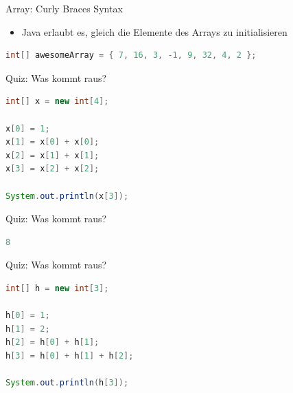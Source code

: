 \documentclass[18pt]{beamer}
\begin{document}
\begin{frame}[fragile]{Array: Curly Braces Syntax}
    \begin{itemize}
        \item Java erlaubt es, gleich die Elemente des Arrays zu initialisieren
    \end{itemize}

    \begin{exampleblock}{}
        \begin{lstlisting}[language=Java]
int[] awesomeArray = { 7, 16, 3, -1, 9, 32, 4, 2 };
        \end{lstlisting}

    \end{exampleblock}

\end{frame}

\begin{frame}[fragile]{Quiz: Was kommt raus?}
    \begin{exampleblock}{}
        \begin{lstlisting}[language=Java]
int[] x = new int[4];

x[0] = 1;
x[1] = x[0] + x[0];
x[2] = x[1] + x[1];
x[3] = x[2] + x[2];

System.out.println(x[3]);
        \end{lstlisting}
    \end{exampleblock}
\end{frame}

\begin{frame}[fragile]{Quiz: Was kommt raus?}
    \begin{block}{}
        \begin{lstlisting}[language=Java]
8
        \end{lstlisting}
    \end{block}
\end{frame}

\begin{frame}[fragile]{Quiz: Was kommt raus?}
    \begin{exampleblock}{}
        \begin{lstlisting}[language=Java]
int[] h = new int[3];

h[0] = 1;
h[1] = 2;
h[2] = h[0] + h[1];
h[3] = h[0] + h[1] + h[2];

System.out.println(h[3]);
        \end{lstlisting}
    \end{exampleblock}
\end{frame}
\end{document}
